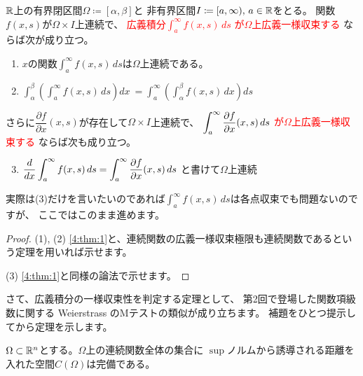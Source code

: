 \documentclass[report]{jlreq}
\begin{document}
    \begin{theorem}[$I$が非有界区間の場合]
        $\mathbb{R}$上の有界閉区間$\Omega \coloneq [\alpha, \beta]$と
        非有界区間$I \coloneq [a, \infty),\, a \in \mathbb{R}$をとる。
        関数$f(x, s)$が$\Omega \times I$上連続で、
        \textcolor{red}{広義積分$\displaystyle \int_a^\infty f(x, s)\, ds$
        が$\Omega$上広義一様収束する}
        ならば次が成り立つ。
        \begin{enumerate}
            \vspace{1em}
            \item $x$の関数$\displaystyle \int_a^\infty f(x, s)\, ds$は$\Omega$上連続である。
            \item $\displaystyle \int_\alpha^\beta \left( \int_a^\infty f(x, s)\, ds \right) dx \
                = \int_a^\infty \left( \int_\alpha^\beta f(x, s)\, dx \right) ds$
            \vspace{1em}
        \end{enumerate}
        さらに$\dfrac{\partial f}{\partial x}(x, s)$が存在して$\Omega \times I$上連続で、
        \textcolor{red}{$\displaystyle \int_a^\infty \deldel[f]{x}(x, s)\, ds$
        が$\Omega$上広義一様収束する}
        ならば次も成り立つ。
        \begin{enumerate}
            \setcounter{enumi}{2}
            \vspace{1em}
            \item $\displaystyle \dd{x} \int_a^\infty f(x, s)\, ds = \int_a^\infty \deldel[f]{x}(x, s)\, ds$
                と書けて$\Omega$上連続
        \end{enumerate}
    \end{theorem}

実際は(3)だけを言いたいのであれば$\displaystyle \int_a^\infty f(x, s)\, ds$は各点収束でも問題ないのですが、
ここではこのまま進めます。

\begin{proof}
    (1), (2) \cref{4:thm:1}と、連続関数の広義一様収束極限も連続関数であるという定理を用いれば示せます。

    (3) \cref{4:thm:1}と同様の論法で示せます。
\end{proof}

さて、広義積分の一様収束性を判定する定理として、
第2回で登場した関数項級数に関する Weierstrass のMテストの類似が成り立ちます。
補題をひとつ提示してから定理を示します。

    \begin{lemma}[連続関数全体の空間の完備性]
        $\Omega \subset \mathbb{R}^n$とする。$\Omega$上の連続関数全体の集合に
        $\sup$ノルムから誘導される距離を入れた空間$C(\Omega)$は完備である。
        \label{4:lemma:1}
    \end{lemma}
\end{document}
